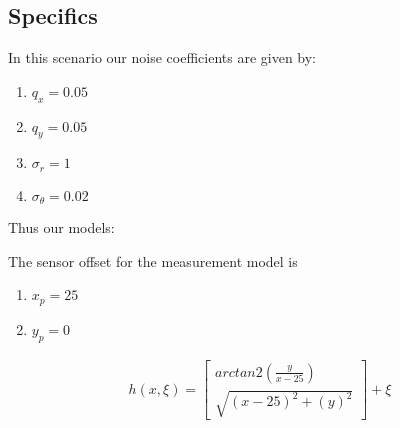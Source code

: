 \documentclass{article}
\begin{document}
\subsection*{Specifics}

In this scenario our noise coefficients are given by:
\begin{enumerate}
\item $q_x = 0.05$
\item $q_y = 0.05$
\item $\sigma_r = 1$
\item $\sigma_\theta = 0.02$
\end{enumerate}
Thus our models:

The sensor offset for the measurement model is 
\begin{enumerate}
\item $x_p = 25$
\item $y_p = 0$
\end{enumerate}

\begin{align*}
h(x,\xi) = \begin{bmatrix}
arctan2(\frac{y}{x-25}) \\
\sqrt{(x-25)^2 + (y)^2}
\end{bmatrix} + \xi
\end{align*}
\end{document}
